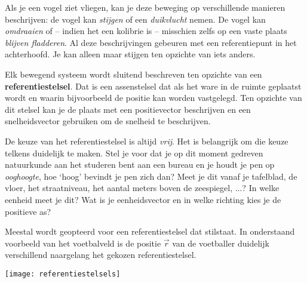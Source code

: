 \documentclass{ximera}
\begin{document}
	\author{Bart Lambregs}
    \xmsource\xmuitleg
 
Als je een vogel ziet vliegen, kan je deze beweging op verschillende manieren beschrijven: de vogel kan \textit{stijgen} of een \textit{duikvlucht} nemen. De vogel kan \textit{omdraaien} of -- indien het een kolibrie is -- misschien zelfs op een vaste plaats \textit{blijven fladderen}. Al deze beschrijvingen gebeuren met een referentiepunt in het achterhoofd. Je kan alleen maar stijgen ten opzichte van iets anders.

Elk bewegend systeem wordt sluitend beschreven ten opzichte van een \textbf{referentiestelsel}. Dat is een assenstelsel dat als het ware in de ruimte geplaatst wordt en waarin bijvoorbeeld de positie kan worden vastgelegd. Ten opzichte van dit stelsel kan je de plaats met een positievector beschrijven en een snelheidsvector gebruiken om de snelheid te beschrijven.

De keuze van het referentiestelsel is altijd \textit{vrij}. Het is belangrijk om die keuze telkens duidelijk te maken. Stel je voor dat je op dit moment gedreven natuurkunde aan het studeren bent aan een bureau en je houdt je pen op \textit{ooghoogte}, hoe `hoog' bevindt je pen zich dan? Meet je dit vanaf je tafelblad, de vloer, het straatniveau, het aantal meters boven de zeespiegel, ...? In welke eenheid meet je dit? Wat is je eenheidsvector en in welke richting kies je de positieve as? 

Meestal wordt geopteerd voor een referentiestelsel dat stilstaat. %
In onderstaand voorbeeld van het voetbalveld is de positie \(\vec{r}\) van de voetballer duidelijk verschillend naargelang het gekozen referentiestelsel.



\begin{center}
\begin{minipage}[t]{0.70\textwidth}
\begin{image}[\linewidth]
	\texttt{[image: referentiestelsels]}
\end{image}
\end{minipage}
\end{center}
\end{document}

